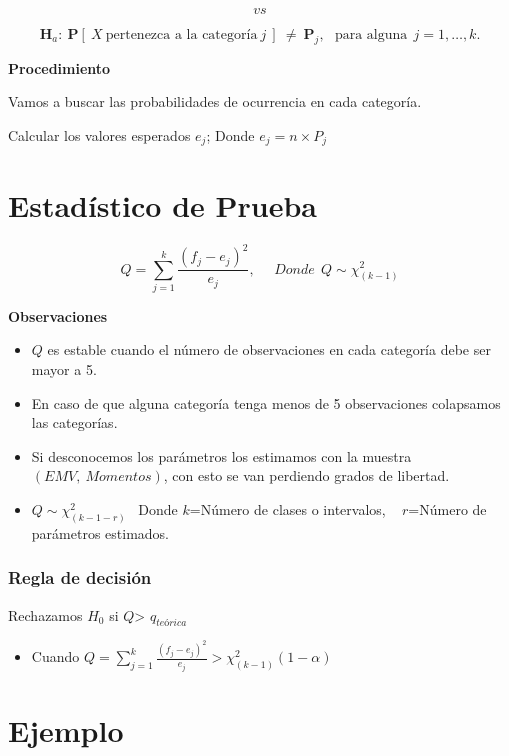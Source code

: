 \documentclass[
  a4paper,
  oneside,
  openany]{book}
\providecommand{\tightlist}{%
  \setlength{\itemsep}{0pt}\setlength{\parskip}{0pt}}
\begin{document}
\[vs\]

\[\textbf{H}_a: \ \mathbf{P}[ \ X \ \mbox{pertenezca a la categoría} \ j \ ] \  \neq \  \mathbf{P}_{j}, \ \ \ \mbox{para alguna} \ \ j=1,\ldots,k.\]

\textbf{Procedimiento}

Vamos a buscar las probabilidades de ocurrencia en cada categoría.

Calcular los valores esperados \(e_{j}\); Donde \(e_{j}=n \times P_{j}\)

\hypertarget{estaduxedstico-de-prueba-13}{%
\section{Estadístico de Prueba}\label{estaduxedstico-de-prueba-13}}

\[Q= \sum_{j=1}^{k}\frac{(f_{j}-e_{j})^2}{e_{j}}, \ \ \ \ \ \ Donde\ \ Q \sim \chi^2_{(k-1)}\]

\textbf{Observaciones}

\begin{itemize}
\item
  \(Q\) es estable cuando el número de observaciones en cada categoría debe ser mayor a 5.
\item
  En caso de que alguna categoría tenga menos de 5 observaciones colapsamos las categorías.
\item
  Si desconocemos los parámetros los estimamos con la muestra \((EMV,\  Momentos)\), con esto se van perdiendo grados de libertad.
\item
  \(Q \sim \chi^2_{(k-1-r)}\) ~Donde \(k\)=Número de clases o intervalos, ~ \(r\)=Número de parámetros estimados.
\end{itemize}

\hypertarget{regla-de-decisiuxf3n-27}{%
\subsubsection*{Regla de decisión}\label{regla-de-decisiuxf3n-27}}


Rechazamos \(H_0\) si \(Q\)\textgreater{} \(q_{teórica}\)

\begin{itemize}
\tightlist
\item
  Cuando \(Q= \sum_{j=1}^{k}\frac{(f_{j}-e_{j})^2}{e_{j}} > \chi^2_{(k-1)}(1-\alpha)\)
\end{itemize}

\hypertarget{ejemplo-12}{%
\section{Ejemplo}\label{ejemplo-12}}
\end{document}
